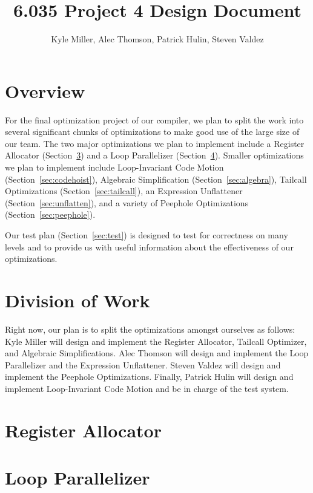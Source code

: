 \documentclass[11pt]{article}
\title{6.035 Project 4 Design Document}
\author{Kyle Miller, Alec Thomson, Patrick Hulin, Steven Valdez}
\begin{document}
\maketitle

\section {Overview} 

For the final optimization project of our compiler, we plan to split
the work into several significant chunks of optimizations to make good
use of the large size of our team. The two major optimizations we plan
to implement include a Register Allocator (Section~\ref{sec:register}) and a Loop
Parallelizer (Section~\ref{sec:parallel}). Smaller optimizations we plan to implement include
Loop-Invariant Code Motion (Section~\ref{sec:codehoist}), Algebraic
Simplification (Section~\ref{sec:algebra}), Tailcall Optimizations
(Section~\ref{sec:tailcall}), an Expression
Unflattener (Section~\ref{sec:unflatten}), and a variety of Peephole
Optimizations (Section~\ref{sec:peephole}). 

Our test plan (Section~\ref{sec:test}) is designed to test for correctness on many levels and
to provide us with useful information about the effectiveness of our
optimizations. 

\section {Division of Work}

Right now, our plan is to split the optimizations amongst ourselves as
follows: Kyle Miller will design and implement the Register
Allocator, Tailcall Optimizer, and Algebraic Simplifications. Alec Thomson will design and implement the Loop
Parallelizer and the Expression Unflattener. Steven Valdez will design and implement the Peephole
Optimizations. Finally, Patrick Hulin will design and implement
Loop-Invariant Code Motion and be in charge of the test system. 

\section {Register Allocator}
\label{sec:register}

\section {Loop Parallelizer}
\label{sec:parallel}
\end{document}
